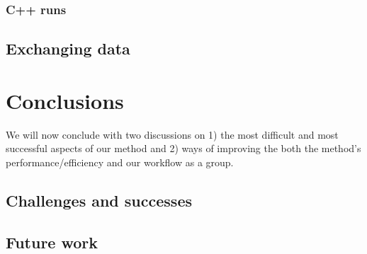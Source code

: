 \documentclass{article}
\begin{document}
\subsubsection{C++ runs}

\subsection{Exchanging data}



\section{Conclusions}
We will now conclude with two discussions on 1) the most difficult and most successful aspects of our method and 2) ways of improving the both the method's performance/efficiency and our workflow as a group.

\subsection{Challenges and successes}


\subsection{Future work}



\end{document}
